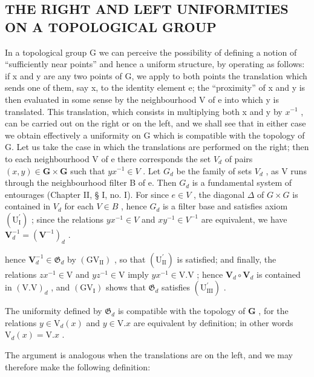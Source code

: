\subsection{THE RIGHT AND LEFT UNIFORMITIES ON A TOPOLOGICAL GROUP}

In a topological group G we can perceive the possibility of defining a notion of ``sufficiently near points'' and hence a uniform structure, by operating as follows: if x and y are any two points of G, we apply to both points the translation which sends one of them, say x, to the identity element e; the ``proximity'' of x and y is then evaluated in some sense by the neighbourhood V of e into which y is translated. This translation, which consists in multiplying both x and y by \(x^{-1}\) , can be carried out on the right or on the left, and we shall see that in either case we obtain effectively a uniformity on G which is compatible with the topology of G. Let us take the case in which the translations are performed on the right; then to each neighbourhood V of e there corresponds the set \(V_{d}\) of pairs \((x, y) \in \mathbf{G} \times \mathbf{G}\) such that \(yx^{-1} \in V\) . Let \(G_{d}\) be the family of sets \(V_{d}\) , as V runs through the neighbourhood filter B of e. Then \(G_{d}\) is a fundamental system of entourages (Chapter II, § I, no. I). For since \(e \in V\) , the diagonal \(\Delta\) of \(G \times G\) is contained in \(V_{d}\) for each \(V \in B\) , hence \(G_{d}\) is a filter base and satisfies axiom \((\mathrm{U}_{\mathrm{I}}^{\prime})\) ; since the relations \(yx^{-1} \in V\) and \(xy^{-1} \in V^{-1}\) are equivalent, we have \(\mathbf{V}_{d}^{-1} = (\mathbf{V}^{-1})_{d}\) .

hence \(\mathbf{V}_{d}^{-1}\in \mathfrak{G}_d\) by \((\mathrm{GV}_{\mathrm{II}})\) , so that \((\mathrm{U}_{\mathrm{II}}^{\prime})\) is satisfied; and finally, the relations \(zx^{-1}\in \mathrm{V}\) and \(yz^{-1}\in \mathrm{V}\) imply \(yx^{-1}\in \mathrm{V.V}\) ; hence \(\mathbf{V}_d\circ \mathbf{V}_d\) is contained in \((\mathrm{V.V})_d\) , and \((\mathrm{GV}_{\mathrm{I}})\) shows that \(\mathfrak{G}_d\) satisfies \((\mathrm{U}_{\mathrm{III}}^{\prime})\) .

The uniformity defined by \(\mathfrak{G}_d\) is compatible with the topology of \(\mathbf{G}\) , for the relations \(y \in \mathrm{V}_d(x)\) and \(y \in \mathrm{V}.x\) are equivalent by definition; in other words \(\mathrm{V}_d(x) = \mathrm{V}.x\) .

The argument is analogous when the translations are on the left, and we may therefore make the following definition:

